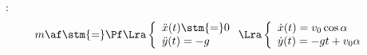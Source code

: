 \documentclass[a4paper, 10pt, final, garamond]{book}
\begin{document}
\begin{enumerate}[label=\sqenumi]
{		\begin{minipage}[c]{0.39\linewidth}
			\begin{center}
				\vspace{-15pt}
			\end{center}
		\end{minipage}
		\begin{enumerate}[label=\sqenumi, start=6]
			~:
			\vspace{-15pt}
			\[m\af \stm{=} \Pf
				\Lra
				\left\{
				\begin{array}{l}
					\ddot{x}(t) \stm{=} 0 \\
					\ddot{y}(t) = -g
				\end{array}
				\right.
				\Lra
				\left\{
				\begin{array}{l}
					\dot{x}(t) = v_0\cos\alpha \\
					\dot{y}(t) = -gt + v_0 \alpha
				\end{array}
				\right.
\]
\end{enumerate}}
\end{enumerate}
\end{document}
